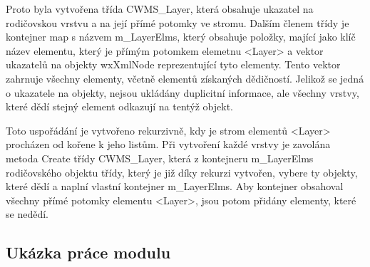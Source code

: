 \documentclass[a4paper,12pt]{article}
\begin{document}
Proto byla vytvořena třída  CWMS\_Layer, která obsahuje ukazatel na rodičovskou vrstvu a na její přímé potomky ve stromu. Dalším členem třídy je kontejner map s názvem m\_LayerElms, který obsahuje položky, mající jako klíč název elementu, který je přímým potomkem elemetnu <Layer> a vektor ukazatelů na objekty wxXmlNode reprezentující tyto elementy. Tento vektor zahrnuje všechny elementy, včetně elementů získaných dědičností. Jelikož se jedná o ukazatele na objekty, nejsou ukládány duplicitní informace, ale všechny vrstvy, které dědí stejný element odkazují na tentýž objekt. 

Toto uspořádání je vytvořeno rekurzivně, kdy je strom elementů <Layer> procházen od kořene k jeho listům. Při vytvoření každé vrstvy je zavolána metoda Create třídy   CWMS\_Layer, která z kontejneru m\_LayerElms  rodičovského objektu třídy, který je již díky rekurzi vytvořen, vybere ty objekty, které dědí a naplní vlastní kontejner m\_LayerElms. Aby kontejner obsahoval všechny přímé potomky elementu <Layer>, jsou potom přidány elementy, které se nedědí. 

\subsection{Ukázka práce modulu}
\end{document}
